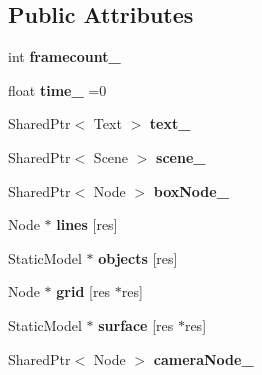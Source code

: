\subsection*{Public Attributes}
\begin{DoxyCompactItemize}
\item 
\mbox{\label{class_my_app_a8bf379bb36f29b7c6c5124e1c06a2b45}} 
int {\bfseries framecount\+\_\+}
\item 
\mbox{\label{class_my_app_a4dae1c5ed807606a13451e985a0968ce}} 
float {\bfseries time\+\_\+} =0
\item 
\mbox{\label{class_my_app_afb29da544e657887bcec9821712acc24}} 
Shared\+Ptr$<$ Text $>$ {\bfseries text\+\_\+}
\item 
\mbox{\label{class_my_app_a8223edfa2f60ff2e7785df950131063c}} 
Shared\+Ptr$<$ Scene $>$ {\bfseries scene\+\_\+}
\item 
\mbox{\label{class_my_app_a6bbe6cefd49083a16aa8036a812d9625}} 
Shared\+Ptr$<$ Node $>$ {\bfseries box\+Node\+\_\+}
\item 
\mbox{\label{class_my_app_ac0b42b6221aff163f04c3adb798ded36}} 
Node $\ast$ {\bfseries lines} \mbox{[}res\mbox{]}
\item 
\mbox{\label{class_my_app_ace04d43303d5ca354324d1c742b9e43f}} 
Static\+Model $\ast$ {\bfseries objects} \mbox{[}res\mbox{]}
\item 
\mbox{\label{class_my_app_a33b9c10c615b674bb7e4bc775ebf0eb2}} 
Node $\ast$ {\bfseries grid} \mbox{[}res $\ast$res\mbox{]}
\item 
\mbox{\label{class_my_app_a46244c083f45bd8644491cc1f43fe524}} 
Static\+Model $\ast$ {\bfseries surface} \mbox{[}res $\ast$res\mbox{]}
\item 
\mbox{\label{class_my_app_a74a44d8de66a418c58b35331a14779b9}} 
Shared\+Ptr$<$ Node $>$ {\bfseries camera\+Node\+\_\+}
\item 
\mbox{\label{class_my_app_a2b6c1c50130a9d9395b3f93dc5d85a99}} 

\end{DoxyCompactItemize}
